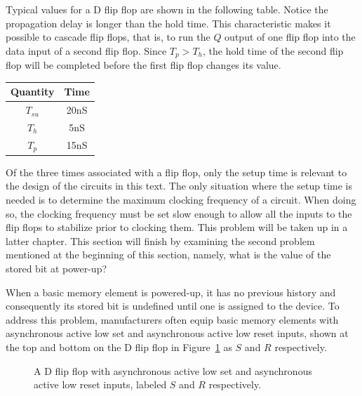 Typical values for a D flip flop are shown in the following
table.  Notice the propagation delay is longer than the hold time.  
This characteristic makes it possible to cascade flip flops, that is, to 
run the $Q$ output of one flip flop into the data input of a second
flip flop.  Since $T_p > T_h$, the hold time of the second flip flop
will be completed before the first flip flop changes its value.
\label{page:FFdelay}

\begin{tabular}{c|c}
Quantity & Time \\ \hline
$T_{su}$ & 20nS  \\ \hline
$T_h$    & 5nS  \\ \hline
$T_p$    & 15nS  \\ 
\end{tabular}

Of the three times associated with a flip flop, only the setup
time is relevant to the design of the circuits in this text.
The only situation where the setup time is needed is to determine
the maximum clocking frequency of a circuit.  When doing so,
the clocking frequency must be set slow enough to allow all the
inputs to the flip flops to stabilize prior to clocking them.  This
problem will be taken up in a latter chapter.  This section will
finish by examining the second problem mentioned at the beginning
of this section, namely, what is the value of the stored bit at power-up?

When a basic memory element is powered-up, it has no previous history
and consequently its stored bit is undefined until one is assigned to
the device.  To address this problem, manufacturers often equip 
basic memory elements with 
asynchronous active low set and 
asynchronous active low reset inputs, shown at the top 
and bottom on the D flip flop in Figure~\ref{fig:DFFSR}
as $S$ and $R$ respectively.

\begin{figure}[ht]
\caption{A D flip flop with asynchronous active low set and asynchronous
active low reset inputs, labeled $S$ and $R$ respectively.}
\label{fig:DFFSR}
\end{figure}

